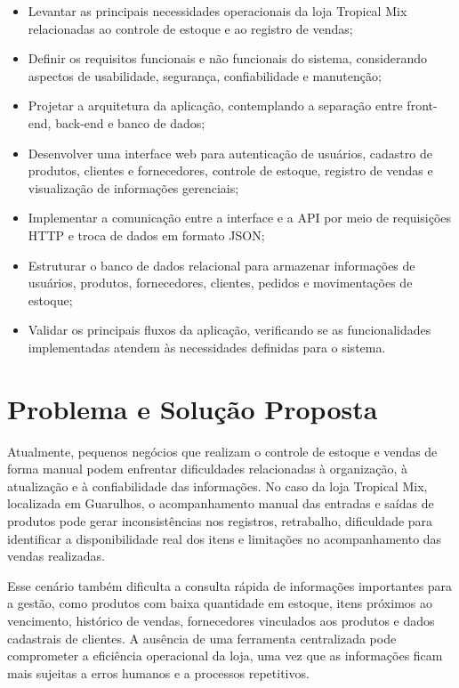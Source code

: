 \begin{itemize}
    \item Levantar as principais necessidades operacionais da loja Tropical Mix relacionadas ao controle de estoque e ao registro de vendas;
    
    \item Definir os requisitos funcionais e não funcionais do sistema, considerando aspectos de usabilidade, segurança, confiabilidade e manutenção;
    
    \item Projetar a arquitetura da aplicação, contemplando a separação entre front-end, back-end e banco de dados;
    
    \item Desenvolver uma interface web para autenticação de usuários, cadastro de produtos, clientes e fornecedores, controle de estoque, registro de vendas e visualização de informações gerenciais;
    
    \item Implementar a comunicação entre a interface e a API por meio de requisições HTTP e troca de dados em formato JSON;
    
    \item Estruturar o banco de dados relacional para armazenar informações de usuários, produtos, fornecedores, clientes, pedidos e movimentações de estoque;
    
    \item Validar os principais fluxos da aplicação, verificando se as funcionalidades implementadas atendem às necessidades definidas para o sistema.
\end{itemize}

\section{Problema e Solução Proposta}

Atualmente, pequenos negócios que realizam o controle de estoque e vendas de forma manual podem enfrentar dificuldades relacionadas à organização, à atualização e à confiabilidade das informações. No caso da loja Tropical Mix, localizada em Guarulhos, o acompanhamento manual das entradas e saídas de produtos pode gerar inconsistências nos registros, retrabalho, dificuldade para identificar a disponibilidade real dos itens e limitações no acompanhamento das vendas realizadas.

Esse cenário também dificulta a consulta rápida de informações importantes para a gestão, como produtos com baixa quantidade em estoque, itens próximos ao vencimento, histórico de vendas, fornecedores vinculados aos produtos e dados cadastrais de clientes. A ausência de uma ferramenta centralizada pode comprometer a eficiência operacional da loja, uma vez que as informações ficam mais sujeitas a erros humanos e a processos repetitivos.

